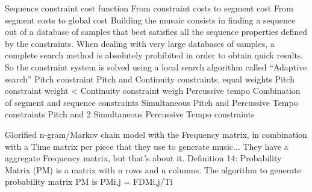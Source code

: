 Sequence constraint cost function
From constraint costs to segment cost
From segment costs to global cost
Building the musaic consists in finding a sequence out of a database of samples that best satisfies all the sequence properties defined by the constraints. When dealing with very large databases of samples, a complete search method is absolutely prohibited in order to obtain quick results. So the constraint system is solved using a local search algorithm called “Adaptive search”
Pitch constraint
Pitch and Continuity constraints, equal weights
Pitch constraint weight < Continuity constraint weigh
Percussive tempo
Combination of segment and sequence constraints
Simultaneous Pitch and Percussive Tempo constraints Pitch and 2 Simultaneous Percussive Tempo constraints


\cite{GarciaSalas2011} Glorified n-gram/Markov chain model with the Frequency matrix, in combination with a Time matrix per piece that they use to generate music...
They have a aggregate Frequency matrix, but that's about it. Definition 14: Probability Matrix (PM) is a matrix with n rows and n columns. The algorithm to generate probability matrix PM is PMi,j = FDMi,j/Ti
